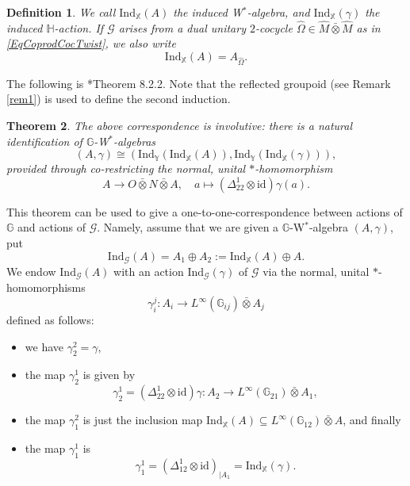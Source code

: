 \documentclass[reqno]{amsart}
\numberwithin{equation}{section}
\newtheorem{Theorem}{Theorem}[section]
\newtheorem{Def}[Theorem]{Definition}
\newcommand{\id}{\mathrm{id}}
\newcommand{\G}{\mathbb{G}}
\newcommand{\Hh}{\mathbb{H}}
\newcommand{\X}{\mathbb{X}}
\newcommand{\Y}{\mathbb{Y}}
\newcommand{\msG}{\mathscr{G}}
\newcommand{\Ind}{\mathrm{Ind}}
\begin{document}
\begin{Def}
We call $\Ind_{\X}(A)$ the \emph{induced W$^*$-algebra}, and $\Ind_{\X}(\gamma)$ the \emph{induced $\Hh$-action}. If $\msG$ arises from a dual unitary $2$-cocycle $\hat{\Omega}\in \hat{M}\bar{\otimes}\hat{M}$ as in \eqref{EqCoprodCocTwist}, we also write 
\begin{equation}
\Ind_{\X}(A) = A_{\hat{\Omega}}. 
\end{equation}
\end{Def}

The following is \cite{DC09}*{Theorem 8.2.2}. Note that the reflected groupoid (see Remark \ref{rem1}) is used to define the second induction.

\begin{Theorem}\label{TheoInductInvol}
The above correspondence is involutive: there is a natural identification of $\G$-W$^*$-algebras
\[
 (A,\gamma)\cong (\Ind_{\Y}(\Ind_{\X}(A)),\Ind_{\Y}(\Ind_{\X}(\gamma))), 
\]
provided through co-restricting the normal, unital $*$-homomorphism
\[
A \rightarrow O \bar{\otimes}N \bar{\otimes} A,\quad a \mapsto (\Delta_{22}^1\otimes \id)\gamma(a).
\]
\end{Theorem}

This theorem can be used to give a one-to-one-correspondence between actions of $\G$ and actions of $\msG$. Namely, assume that we are given a $\G$-W$^*$-algebra $(A,\gamma)$, put  
\begin{equation}\label{EqInducedAction}
\Ind_{\msG}(A) = A_1\oplus A_2 := \Ind_{\X}(A)\oplus A.
\end{equation}
 We endow $\Ind_{\msG}(A)$ with an action $\Ind_{\msG}(\gamma)$ of $\msG$ via the normal, unital $*$-homomorphisms 
\[
\gamma_i^j\colon A_i \rightarrow L^{\infty}(\mathbb{G}_{ij})\bar{\otimes} A_j
\]
defined as follows: 
\begin{itemize}
\item we have $\gamma_2^2 = \gamma$,
\item the map $\gamma_2^1$ is given by 
\begin{equation}\label{eq50}
\gamma_2^1 =(\Delta_{22}^1\otimes \id) \gamma\colon A_2 \rightarrow L^{\infty}(\G_{21})\bar{\otimes} A_1,
\end{equation}
\item the map $\gamma_1^2$ is just the inclusion map $\Ind_{\X}(A) \subseteq L^{\infty}(\G_{12})\bar{\otimes} A$, and finally
\item the map $\gamma_1^1$ is
\[
\gamma_1^1 = (\Delta_{12}^1\otimes \id)_{\mid A_1}=\Ind_{\X}(\gamma). 
\]
\end{itemize}
\end{document}
